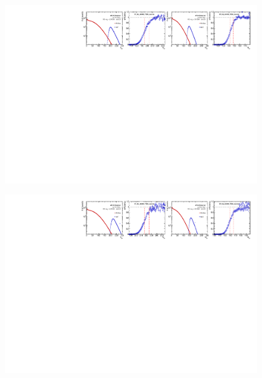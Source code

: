 \begin{figure}[H]
\centering
\includegraphics[width=1.\linewidth]{figs/sec_evtSlc/trigEff_pPb5_run1/trigEff_Trig11.pdf}
\end{figure}
\begin{figure}[H]
\centering
\includegraphics[width=1.\linewidth]{figs/sec_evtSlc/trigEff_pPb5_run1/trigEff_Trig12.pdf}
\end{figure}

